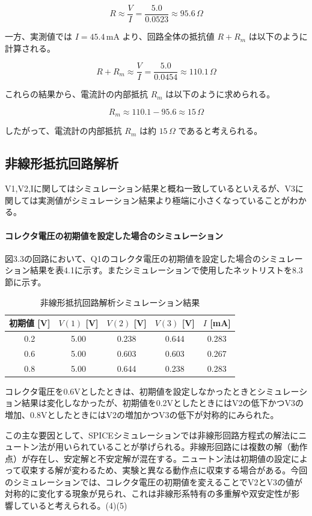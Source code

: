 \documentclass{jlreq}
\numberwithin{equation}{section}
\begin{document}
\[
R \approx \frac{V}{I} = \frac{5.0}{0.0523} \approx 95.6 \, \Omega
\]

一方、実測値では \( I = 45.4 \, \mathrm{mA} \) より、回路全体の抵抗値 \( R + R_m \) は以下のように計算される。

\[
R + R_m \approx \frac{V}{I} = \frac{5.0}{0.0454} \approx 110.1 \, \Omega
\]

これらの結果から、電流計の内部抵抗 \( R_m \) は以下のように求められる。

\[
R_m \approx 110.1 - 95.6 \approx 15 \, \Omega
\]

したがって、電流計の内部抵抗 \( R_m \) は約 \( 15 \, \Omega \) であると考えられる。

\subsection{非線形抵抗回路解析}
V1,V2,Iに関してはシミュレーション結果と概ね一致しているといえるが、V3に関しては実測値がシミュレーション結果より極端に小さくなっていることがわかる。\\

\paragraph{コレクタ電圧の初期値を設定した場合のシミュレーション}
図3.3の回路において、Q1のコレクタ電圧の初期値を設定した場合のシミュレーション結果を表4.1に示す。またシミュレーションで使用したネットリストを8.3節に示す。
\begin{table}[H]
  \centering
  \caption{非線形抵抗回路解析シミュレーション結果}
  \begin{tabular}{|c|c|c|c|c|}
    \hline
    初期値 [V] & \( V(1) \) [V] & \( V(2) \) [V] & \( V(3) \) [V] & \( I \) [mA] \\ \hline
    0.2 & 5.00 & 0.238 & 0.644 & 0.283 \\ \hline
    0.6 & 5.00 & 0.603 & 0.603 & 0.267 \\ \hline
    0.8 & 5.00 & 0.644 & 0.238 & 0.283 \\ \hline
  \end{tabular}
\end{table}

コレクタ電圧を0.6Vとしたときは、初期値を設定しなかったときとシミュレーション結果は変化しなかったが、初期値を0.2VとしたときにはV2の低下かつV3の増加、0.8VとしたときにはV2の増加かつV3の低下が対称的にみられた。

この主な要因として、SPICEシミュレーションでは非線形回路方程式の解法にニュートン法が用いられていることが挙げられる。非線形回路には複数の解（動作点）が存在し、安定解と不安定解が混在する。ニュートン法は初期値の設定によって収束する解が変わるため、実験と異なる動作点に収束する場合がある。今回のシミュレーションでは、コレクタ電圧の初期値を変えることでV2とV3の値が対称的に変化する現象が見られ、これは非線形系特有の多重解や双安定性が影響していると考えられる。(4)(5)
\end{document}
